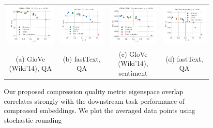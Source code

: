\begin{figure}
	\footnotesize
	\begin{tabular}{@{\hskip -0.0in}c@{\hskip -0.0in}c@{\hskip -0.0in}c@{\hskip -0.0in}c@{\hskip -0.0in}}
		\includegraphics[width=.245\linewidth]{figures/glove400k_qa_best-f1_vs_subspace-dist-normalized_linx_stoc_ave-pt.pdf} &
		\includegraphics[width=.245\linewidth]{figures/fasttext1m_qa_best-f1_vs_subspace-dist-normalized_linx_stoc_ave-pt.pdf} &
		\includegraphics[width=.245\linewidth]{figures/glove400k_sentiment_sst_test-acc_vs_subspace-dist-normalized_linx_stoc_ave-pt.pdf} &
		\includegraphics[width=.245\linewidth]{figures/fasttext1m_sentiment_sst_test-acc_vs_subspace-dist-normalized_linx_stoc_ave-pt.pdf}	\\
		(a) GloVe (Wiki'14), QA & \;\;\;\;(b) fastText, QA  & \;\;\;\;\;\;(c) GloVe (Wiki'14), sentiment & \;\;\;\;\;(d) fastText, QA 
	\end{tabular}
	\caption{Our proposed compression quality metric eigenspace overlap correlates strongly with the downstream task performance of compressed embeddings. We plot the averaged data points using stochastic rounding}
	\label{fig:good_correlation_stoc_ave_pt}
\end{figure}


